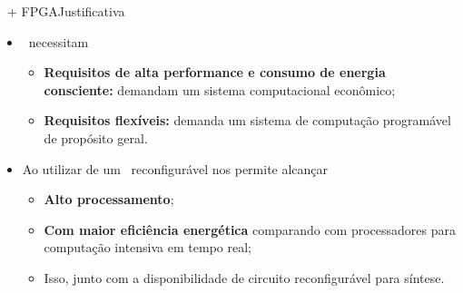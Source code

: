       
      \begin{frame}{\Wearable\ + FPGA}{Justificativa  \cite{Plessl2003}} \vspace{-1em}
         \begin{itemize}
            \setlength{\itemsep}{1.6em}
            \item \Wearables\ necessitam
            \begin{itemize}
               \setlength{\itemsep}{0.8em}
               
               \item \textbf{Requisitos de alta performance e consumo de energia consciente:} demandam um sistema computacional econômico;
               
               \item \textbf{Requisitos flexíveis:} demanda um sistema de computação programável de propósito geral.
            \end{itemize}
         
            \item Ao utilizar de um \hardware\ reconfigurável nos permite alcançar
            \begin{itemize}
               \item \textbf{Alto processamento};
               \item \textbf{Com maior eficiência energética} comparando com processadores para computação intensiva em tempo real;
               \item Isso, junto com a disponibilidade de circuito reconfigurável para síntese.
            \end{itemize}
         \end{itemize}
      \end{frame}
